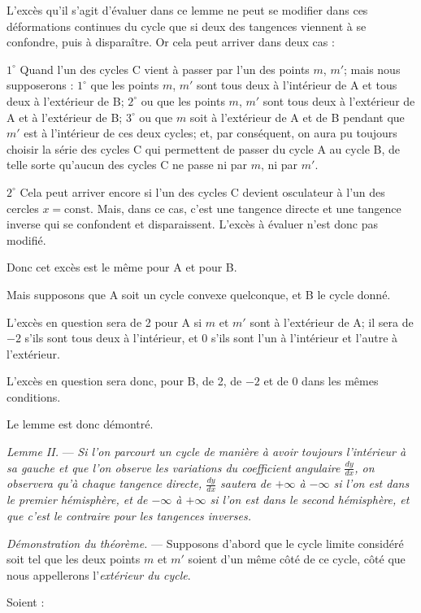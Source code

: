 \documentclass[11pt]{article}
\begin{document}
L'excès qu'il s'agit d'évaluer dans ce lemme ne peut se modifier dans ces déformations continues du cycle que si deux des tangences viennent à se confondre, puis à disparaître. Or cela peut arriver dans deux cas :

$1^\circ$ Quand l'un des cycles C vient à passer par l'un des points $m$, $m'$; mais nous supposerons : $1^\circ$ que les points $m$, $m'$ sont tous deux à l'intérieur de A et tous deux à l'extérieur de B; $2^\circ$ ou que les points $m$, $m'$ sont tous deux à l'extérieur de A et à l'extérieur de B; $3^\circ$ ou que $m$ soit à l'extérieur de A et de B pendant que $m'$ est à l'intérieur de ces deux cycles; et, par conséquent, on aura pu toujours choisir la série des cycles C qui permettent de passer du cycle A au cycle B, de telle sorte qu'aucun des cycles C ne passe ni par $m$, ni par $m'$.

$2^\circ$ Cela peut arriver encore si l'un des cycles C devient osculateur à l'un des cercles $x=\mathrm{const.}$ Mais, dans ce cas, c'est une tangence directe et une tangence inverse qui se confondent et disparaissent. L'excès à évaluer n'est donc pas modifié.

Donc cet excès est le même pour A et pour B.

Mais supposons que A soit un cycle convexe quelconque, et B le cycle donné.

L'excès en question sera de 2 pour A si $m$ et $m'$ sont à l'extérieur de A; il sera de $-2$ s'ils sont tous deux à l'intérieur, et 0 s'ils sont l'un à l'intérieur et l'autre à l'extérieur.

L'excès en question sera donc, pour B, de 2, de $-2$ et de 0 dans les mêmes conditions.

Le lemme est donc démontré.

\emph{Lemme II.} --- \emph{Si l'on parcourt un cycle de manière à avoir toujours l'intérieur à sa gauche et que l'on observe les variations du coefficient angulaire $\frac{dy}{dx}$, on observera qu'à chaque tangence directe, $\frac{dy}{dx}$ sautera de $+\infty$ à $-\infty$ si l'on est dans le premier hémisphère, et de $-\infty$ à $+\infty$ si l'on est dans le second hémisphère, et que c'est le contraire pour les tangences inverses.}

\emph{Démonstration du théorème.} --- Supposons d'abord que le cycle limite considéré soit tel que les deux points $m$ et $m'$ soient d'un même côté de ce cycle, côté que nous appellerons l'\emph{extérieur du cycle}.

Soient :
\end{document}
